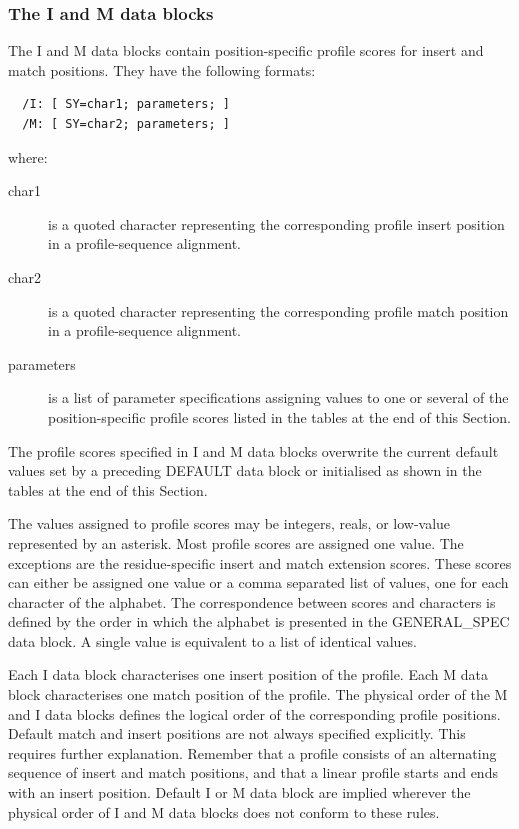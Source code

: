 \documentclass[a4paper,10pt,twoside]{scrartcl}
\begin{document}
  \subsubsection{The I and M data blocks}

  The I and M data blocks contain position-specific profile scores for insert and match positions. They have the following formats:
\begin{verbatim}
  /I: [ SY=char1; parameters; ]
  /M: [ SY=char2; parameters; ]
\end{verbatim}
  where:
  \begin{description}
  \item[char1] is a quoted character representing the corresponding profile insert position in a profile-sequence alignment.
  \item[char2] is a quoted character representing the corresponding profile match position in a profile-sequence alignment.
  \item[parameters] is a list of parameter specifications assigning values to one or several of the position-specific profile scores listed in the
   tables at the end of this Section.
  \end{description}
  
  The profile scores specified in I and M data blocks overwrite the current default values set by a preceding DEFAULT data block or initialised as
  shown in the tables at the end of this Section.

  The values assigned to profile scores may be integers, reals, or low-value represented by an asterisk. Most profile scores are assigned one value.
  The exceptions are the residue-specific insert and match extension scores. These scores can either be assigned one value or a comma separated list of
  values, one for each character of the alphabet. The correspondence between scores and characters is defined by the order in which the alphabet is
  presented in the GENERAL\_SPEC data block. A single value is equivalent to a list of identical values.

  Each I data block characterises one insert position of the profile.  Each M data block characterises one match position of the profile. The physical order 
  of the M and I data blocks defines the logical order of the corresponding profile positions. Default match and insert positions are
  not always specified explicitly.  This requires further explanation. Remember that a profile consists of an alternating sequence of insert and
  match positions, and that a linear profile starts and ends with an insert position.  Default I or M data block are implied wherever the physical
  order of I and M data blocks does not conform to these rules.
\end{document}
